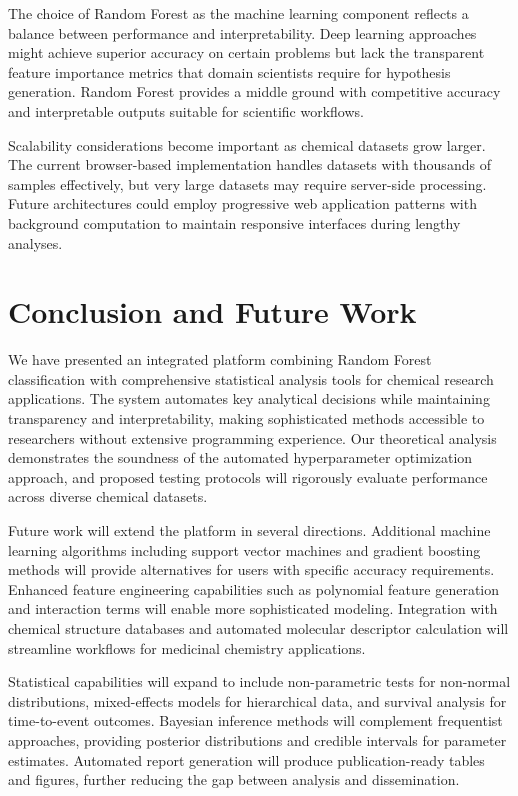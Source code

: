 \documentclass[conference]{IEEEtran}
\begin{document}
The choice of Random Forest as the machine learning component reflects a balance between performance and interpretability. Deep learning approaches might achieve superior accuracy on certain problems but lack the transparent feature importance metrics that domain scientists require for hypothesis generation. Random Forest provides a middle ground with competitive accuracy and interpretable outputs suitable for scientific workflows.

Scalability considerations become important as chemical datasets grow larger. The current browser-based implementation handles datasets with thousands of samples effectively, but very large datasets may require server-side processing. Future architectures could employ progressive web application patterns with background computation to maintain responsive interfaces during lengthy analyses.

\section{Conclusion and Future Work}

We have presented an integrated platform combining Random Forest classification with comprehensive statistical analysis tools for chemical research applications. The system automates key analytical decisions while maintaining transparency and interpretability, making sophisticated methods accessible to researchers without extensive programming experience. Our theoretical analysis demonstrates the soundness of the automated hyperparameter optimization approach, and proposed testing protocols will rigorously evaluate performance across diverse chemical datasets.

Future work will extend the platform in several directions. Additional machine learning algorithms including support vector machines and gradient boosting methods will provide alternatives for users with specific accuracy requirements. Enhanced feature engineering capabilities such as polynomial feature generation and interaction terms will enable more sophisticated modeling. Integration with chemical structure databases and automated molecular descriptor calculation will streamline workflows for medicinal chemistry applications.

Statistical capabilities will expand to include non-parametric tests for non-normal distributions, mixed-effects models for hierarchical data, and survival analysis for time-to-event outcomes. Bayesian inference methods will complement frequentist approaches, providing posterior distributions and credible intervals for parameter estimates. Automated report generation will produce publication-ready tables and figures, further reducing the gap between analysis and dissemination.
\end{document}
